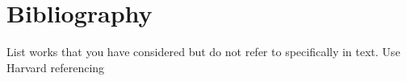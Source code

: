 \section{Bibliography}
List works that you have considered but do not refer to specifically in text. Use Harvard referencing